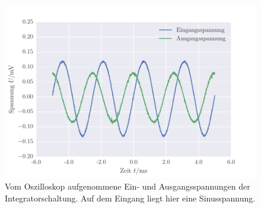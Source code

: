 \FloatBarrier
\begin{figure}[!h]
\centering
\includegraphics[scale=1]{../Grafiken/Integrator_Oszilloskop_Sinus.pdf}
\caption{Vom Oszilloskop aufgenommene Ein- und Ausgangsspannungen der Integratorschaltung. Auf dem Eingang
	liegt hier eine Sinusspannung. \label{fig:integrator_oszilloskop_sinus}}
\end{figure}
\FloatBarrier